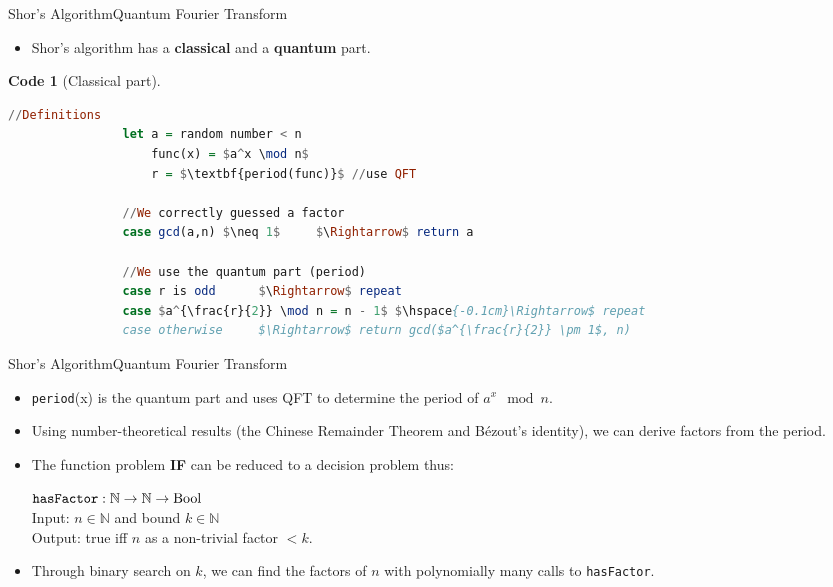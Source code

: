 \documentclass{beamer}
\newcommand{\mt}[1]{\textnormal{#1}}
\newtheorem{code}[theorem]{Code}
\begin{document}
\begin{frame}[fragile]{Shor's Algorithm}{Quantum Fourier Transform}       
	\begin{itemize}
    	\item Shor's algorithm has a \textbf{classical} and a \textbf{quantum} part.
    \end{itemize}
    
    \begin{code}[Classical part]
    	\begin{flushleft}
        	\vspace{-0.5cm}
			\begin{lstlisting}[mathescape, language=Haskell]
				//Definitions
				let a = random number < n
				    func(x) = $a^x \mod n$
				    r = $\textbf{period(func)}$ //use QFT
				
				//We correctly guessed a factor
				case gcd(a,n) $\neq 1$     $\Rightarrow$ return a
				
				//We use the quantum part (period)
				case r is odd      $\Rightarrow$ repeat
				case $a^{\frac{r}{2}} \mod n = n - 1$ $\hspace{-0.1cm}\Rightarrow$ repeat
				case otherwise     $\Rightarrow$ return gcd($a^{\frac{r}{2}} \pm 1$, n)
			\end{lstlisting}
		\end{flushleft}
    \end{code}
\end{frame}

\begin{frame}[fragile]{Shor's Algorithm}{Quantum Fourier Transform}       
	\begin{itemize}
    	\item \texttt{period}(x) is the quantum part and uses QFT to determine the period of $a^x \mod n$.
        \item Using number-theoretical results (the Chinese Remainder Theorem and Bézout's identity), we can derive factors from the period.\\
        
        \item The function problem \textbf{IF} can be reduced to a decision problem thus:
        
      \begin{definition}
          $\texttt{hasFactor} : \mathbb{N} \rightarrow \mathbb{N} \rightarrow \mt{Bool}$\\
              Input: $n \in \mathbb{N}$ and bound $k \in \mathbb{N}$\\
              Output: true iff $n$ as a non-trivial factor $<k$.
      \end{definition}
      
      \item Through binary search on $k$, we can find the factors of $n$ with polynomially many calls to \texttt{hasFactor}.
    \end{itemize}
\end{frame}
\end{document}
